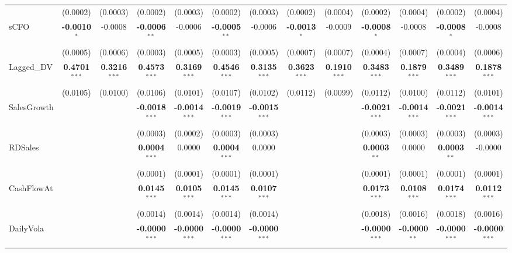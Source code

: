 \begin{landscape}
\begin{table}[H]
\begin{tabular}{lcccccccccccc}
 & (0.0002) & (0.0003) & (0.0002) & (0.0003) & (0.0002) & (0.0003) & (0.0002) & (0.0004) & (0.0002) & (0.0004) & (0.0002) & (0.0004) \\
sCFO & \textbf{-0.0010}$^{*}$ & -0.0008 & \textbf{-0.0006}$^{**}$ & -0.0006 & \textbf{-0.0005}$^{**}$ & -0.0006 & \textbf{-0.0013}$^{*}$ & -0.0009 & \textbf{-0.0008}$^{*}$ & -0.0008 & \textbf{-0.0008}$^{*}$ & -0.0008 \\
 & (0.0005) & (0.0006) & (0.0003) & (0.0005) & (0.0003) & (0.0005) & (0.0007) & (0.0007) & (0.0004) & (0.0007) & (0.0004) & (0.0006) \\
Lagged\_DV & \textbf{0.4701}$^{***}$ & \textbf{0.3216}$^{***}$ & \textbf{0.4573}$^{***}$ & \textbf{0.3169}$^{***}$ & \textbf{0.4546}$^{***}$ & \textbf{0.3135}$^{***}$ & \textbf{0.3623}$^{***}$ & \textbf{0.1910}$^{***}$ & \textbf{0.3483}$^{***}$ & \textbf{0.1879}$^{***}$ & \textbf{0.3489}$^{***}$ & \textbf{0.1878}$^{***}$ \\
 & (0.0105) & (0.0100) & (0.0106) & (0.0101) & (0.0107) & (0.0102) & (0.0112) & (0.0099) & (0.0112) & (0.0100) & (0.0112) & (0.0101) \\
SalesGrowth &  &  & \textbf{-0.0018}$^{***}$ & \textbf{-0.0014}$^{***}$ & \textbf{-0.0019}$^{***}$ & \textbf{-0.0015}$^{***}$ &  &  & \textbf{-0.0021}$^{***}$ & \textbf{-0.0014}$^{***}$ & \textbf{-0.0021}$^{***}$ & \textbf{-0.0014}$^{***}$ \\
 &  &  & (0.0003) & (0.0002) & (0.0003) & (0.0003) &  &  & (0.0003) & (0.0003) & (0.0003) & (0.0003) \\
RDSales &  &  & \textbf{0.0004}$^{***}$ & 0.0000 & \textbf{0.0004}$^{***}$ & 0.0000 &  &  & \textbf{0.0003}$^{**}$ & 0.0000 & \textbf{0.0003}$^{**}$ & -0.0000 \\
 &  &  & (0.0001) & (0.0001) & (0.0001) & (0.0001) &  &  & (0.0001) & (0.0001) & (0.0001) & (0.0001) \\
CashFlowAt &  &  & \textbf{0.0145}$^{***}$ & \textbf{0.0105}$^{***}$ & \textbf{0.0145}$^{***}$ & \textbf{0.0107}$^{***}$ &  &  & \textbf{0.0173}$^{***}$ & \textbf{0.0108}$^{***}$ & \textbf{0.0174}$^{***}$ & \textbf{0.0112}$^{***}$ \\
 &  &  & (0.0014) & (0.0014) & (0.0014) & (0.0014) &  &  & (0.0018) & (0.0016) & (0.0018) & (0.0016) \\
DailyVola &  &  & \textbf{-0.0000}$^{***}$ & \textbf{-0.0000}$^{***}$ & \textbf{-0.0000}$^{***}$ & \textbf{-0.0000}$^{***}$ &  &  & \textbf{-0.0000}$^{***}$ & \textbf{-0.0000}$^{**}$ & \textbf{-0.0000}$^{***}$ & \textbf{-0.0000}$^{***}$ \\

\end{tabular}
\end{table}
\end{landscape}
